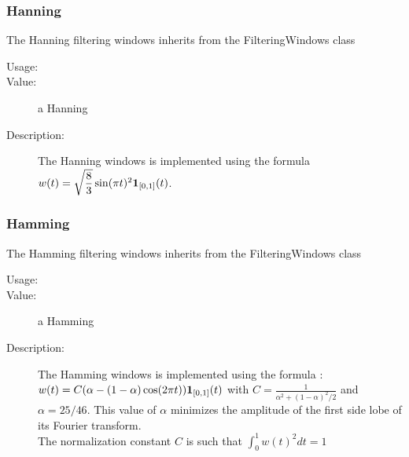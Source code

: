 \newpage
\subsubsection{Hanning}

The Hanning filtering windows inherits from the FilteringWindows class

\begin{description}

\item[Usage:] \rule{0pt}{1em}
\bigskip


\item[Value:] a Hanning
\rule{0pt}{1em}
\bigskip

\item[Description:]  \rule{0pt}{1em}

The Hanning windows is implemented using the formula $w(t) =  \sqrt{\dfrac{8}{3}} \sin(\pi t)^2{\mathbf 1}_{[0,1]}(t)$.


\end{description}


\newpage
\subsubsection{Hamming}
The Hamming filtering windows inherits from the FilteringWindows class

\begin{description}

\item[Usage:] \rule{0pt}{1em}
\bigskip


\item[Value:] a Hamming
\rule{0pt}{1em}
\bigskip

\item[Description:]  \rule{0pt}{1em}

The Hamming windows is implemented using the formula : \\ $w(t) =  C(\alpha - (1-\alpha)\cos(2\pi t)){\mathbf 1}_{[0,1]}(t)$ with $C = \frac{1}{\alpha^2 + (1-\alpha)^2/2}$ and $\alpha=25/46$. This value of $\alpha$ minimizes the amplitude of the first side lobe of its Fourier transform.\\
The normalization constant $C$ is such that $\int_{0}^{1} w(t)^2 dt = 1 $


\end{description}



